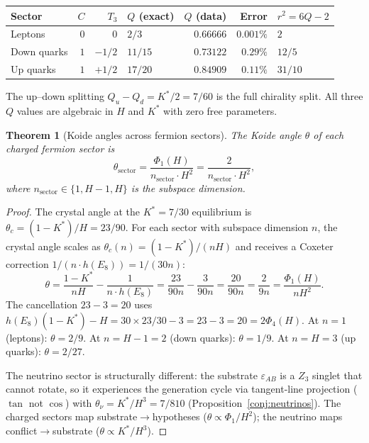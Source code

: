 \documentclass[11pt,a4paper]{article}
\let\hline\midrule
\newtheorem{theorem}{Theorem}[section]
\theoremstyle{definition}
\theoremstyle{remark}
\begin{document}
\begin{center}
\begin{tabular}{lrrlrrl}
\hline
Sector & $C$ & $T_3$ & $Q$ (exact) & $Q$ (data) & Error & $r^2=6Q-2$ \\
\hline
Leptons & $0$ & $0$ & $2/3$ & $0.66666$ & $0.001\%$ & $2$ \\
Down quarks & $1$ & $-1/2$ & $11/15$ & $0.73122$ & $0.29\%$ & $12/5$ \\
Up quarks & $1$ & $+1/2$ & $17/20$ & $0.84909$ & $0.11\%$ & $31/10$ \\
\hline
\end{tabular}
\end{center}

The up--down splitting $Q_u-Q_d=K^*/2=7/60$ is the full chirality split. All three $Q$ values are algebraic in $H$ and $K^*$ with zero free parameters.

\begin{theorem}[Koide angles across fermion sectors]\label{thm:koide_angles_all}
The Koide angle $\theta$ of each charged fermion sector is
\begin{equation}\label{eq:theta_sectors}
\theta_{\mathrm{sector}} = \frac{\Phi_1(H)}{n_{\mathrm{sector}}\cdot H^2} = \frac{2}{n_{\mathrm{sector}}\cdot H^2},
\end{equation}
where $n_{\mathrm{sector}}\in\{1,H-1,H\}$ is the subspace dimension.
\end{theorem}

\begin{proof}
The crystal angle at the $K^*=7/30$ equilibrium is $\theta_c=(1-K^*)/H=23/90$. For each sector with subspace dimension $n$, the crystal angle scales as $\theta_c(n)=(1-K^*)/(nH)$ and receives a Coxeter correction $1/(n\cdot h(E_8))=1/(30n)$:
\[
\theta=\frac{1-K^*}{nH}-\frac{1}{n\cdot h(E_8)}=\frac{23}{90n}-\frac{3}{90n}=\frac{20}{90n}=\frac{2}{9n}=\frac{\Phi_1(H)}{nH^2}.
\]
The cancellation $23-3=20$ uses $h(E_8)(1-K^*)-H=30\times 23/30-3=23-3=20=2\Phi_4(H)$. At $n=1$ (leptons): $\theta=2/9$. At $n=H-1=2$ (down quarks): $\theta=1/9$. At $n=H=3$ (up quarks): $\theta=2/27$.

The neutrino sector is structurally different: the substrate $\varepsilon_{AB}$ is a $Z_3$ singlet that cannot rotate, so it experiences the generation cycle via tangent-line projection ($\tan$ not $\cos$) with $\theta_\nu=K^*/H^3=7/810$ (Proposition~\ref{conj:neutrinos}). The charged sectors map substrate$\to$hypotheses ($\theta\propto\Phi_1/H^2$); the neutrino maps conflict$\to$substrate ($\theta\propto K^*/H^3$).
\end{proof}
\end{document}
